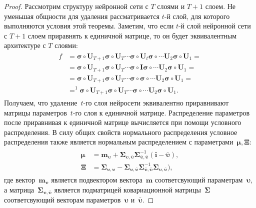 \documentclass[12pt]{a&t}
\begin{document}
\begin{proof}
Рассмотрим структуру нейронной сети с $T$ слоями и $T+1$ слоем. Не уменьшая общности для удаления рассматривается $t$-й слой, для которого выполняются условия этой теоремы. Заметим, что если $t$-й слой нейронной сети с $T+1$ слоем приравнять к единичной матрице, то он будет эквивалентным архитектуре с $T$ слоями:
\begin{gather}
\label{eq:ap:tr:2:1}
\begin{aligned}
f &= \bm{\sigma} \circ \mathbf{U}_{T+1}\bm{\sigma} \circ \mathbf{U}_T \cdots \bm{\sigma} \circ \mathbf{U}_t\bm{\sigma} \circ \cdots  \mathbf{U}_2\bm{\sigma} \circ \mathbf{U}_1 =\\
&=  \bm{\sigma} \circ \mathbf{U}_{T+1}\bm{\sigma} \circ \mathbf{U}_T \cdots \bm{\sigma} \circ \mathbf{I}\bm{\sigma} \circ \cdots  \mathbf{U}_2\bm{\sigma} \circ \mathbf{U}_1 =\\
&=  \bm{\sigma} \circ \mathbf{U}_{T+1}\bm{\sigma} \circ \mathbf{U}_T \cdots \bm{\sigma} \circ \bm{\sigma} \circ \cdots  \mathbf{U}_2\bm{\sigma} \circ \mathbf{U}_1 =\\
&=^{1}  \bm{\sigma} \circ \mathbf{U}_{T+1}\bm{\sigma} \circ \mathbf{U}_T \cdots \bm{\sigma} \circ \cdots  \mathbf{U}_2\bm{\sigma} \circ \mathbf{U}_1.
\end{aligned}
\end{gather}
Получаем, что удаление~$t$-го слоя нейросети эквивалентно приравнивают матрицы параметров~$t$-го слоя к единичной матрице. Распределение параметров после приравнивая к единичной матрице вычисляется при помощи условного распределения. В силу общих свойств нормального распределения условное распределения также является нормальным распределением с параметрами~$\bm{\mu}, \bm{\Xi}:$
\begin{gather}
\label{eq:ap:tr:2:2}
\begin{aligned}
\bm{\mu} &= \mathbf{m}_{\bm{\upsilon}}+\bm{\Sigma}_{\bm{\upsilon},\bar{\bm{\upsilon}}} \bm{\Sigma}_{\bar{\bm{\upsilon}},\bar{\bm{\upsilon}}}^{-1} \left(\mathbf{i} - \bar{\bm{\upsilon}}\right), \\
\bm{\Xi} &= \bm{\Sigma}_{\bm{\upsilon},\bm{\upsilon}} - \bm{\Sigma}_{\bm{\upsilon},\bar{\bm{\upsilon}}}\bm{\Sigma}_{\bar{\bm{\upsilon}},\bar{\bm{\upsilon}}}^{-1}\bm{\Sigma}_{\bm{\upsilon},\bar{\bm{\upsilon}}}\bigr),
\end{aligned}
\end{gather}
где вектор~$\mathbf{m}_{\bm{\upsilon}}$ является подвектором вектора~$\mathbf{m}$ соответсвующий параметрам~$\bm{\upsilon},$ а матрица~$\bm{\Sigma}_{\bm{\upsilon},\bar{\bm{\upsilon}}}$ является подматрицей ковариационной матрицы~$\bm{\Sigma}$ соответсвующий векторам параметров~$\bm{\upsilon}$ и~$\bar{\bm{\upsilon}}.$
\end{proof}
\end{document}
